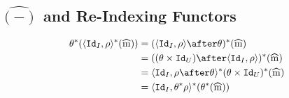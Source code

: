 {    \subsection{$\hat{(-)}$ and Re-Indexing Functors}
    \begin{align}
        \theta\star(\pr{\Id{I}}{\rho}\star(\widehat{m})) &= (\pr{\Id{I}}{\rho}\after\theta)\star(\widehat{m})\\
        & = ((\theta\times\Id{U})\after\pr{\Id{I}}{\rho})\star(\widehat{m})\\
        & = \pr{\Id{I}}{\rho\after\theta}\star(\theta\times\Id{U})\star(\widehat{m}) \\
        & = \pr{\Id{I}}{\theta\star\rho}\star(\theta\star(\widehat{m}))
    \end{align}
}
\newcommand\effectDenotations[0]{
    \section{Effects}
For each instance of the well-formed-ness relation on effects, we define a morphism $\deno{\typerelation{\P}{\e}{\effect}}: \ciu$

\begin{itemize}
    \item $\deno{\typerelation{\P}{e}{\effect}} = \deno{\e} \after \term{I}: \rightarrow U$
    \item $\deno{\typerelation{\P,\a}{\a}{\effect}} = \pp: I\times U \rightarrow U$
    
    \item $\deno{\typerelation{\P, \b}{\a}{\effect}} = \deno{\typerelation{\P}{\a}{\effect}}\after\p: I\times U\rightarrow U$
    
    \item $\deno{\typerelation{\P}{\e_1\dot \e_2}{\effect}} = \Mul(\deno{\typerelation{\P}{\e_2}{\effect}},\deno{\typerelation{\P}{\e_1}{\effect}}): I \rightarrow U$
\end{itemize}
}

